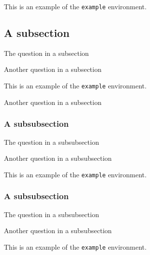 \documentclass{article}
\newcounter{question}
\newcounter{example}
\begin{document}
    \begin{example}
        This is an example of the \texttt{example} environment.
    \end{example}

    \subsection{A subsection}

    \begin{question}
    The question in a subsection
    \end{question}

    \begin{question}
    Another question in a subsection
    \end{question}

    \begin{example}
        This is an example of the \texttt{example} environment.
    \end{example}

    \begin{question}
    Another question in a subsection
    \end{question}

    \subsubsection{A subsubsection}

    \begin{question}
    The question in a subsubsection
    \end{question}

    \begin{question}
    Another question in a subsubsection
    \end{question}

    \begin{example}
        This is an example of the \texttt{example} environment.
    \end{example}

    \subsubsection{A subsubsection}

    \begin{question}
    The question in a subsubsection
    \end{question}

    \begin{question}
    Another question in a subsubsection
    \end{question}

    \begin{example}
        This is an example of the \texttt{example} environment.
    \end{example}

    
\end{document}
